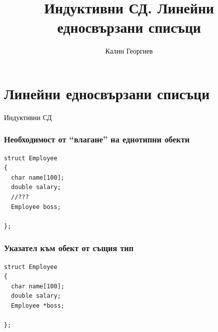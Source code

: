 \documentclass{beamer}
\begin{document}
\title[Обектно ориентирано програмиране]{Индуктивни СД. Линейни едносвързани списъци} 
\author{Калин Георгиев} 
\frame{\titlepage} 

\section{Линейни едносвързани списъци} 


\begin{frame}
\centerline{Индуктивни СД}
\end{frame}


\begin{frame}[fragile]
\frametitle{Необходимост от ``влагане'' на еднотипни обекти}
\begin{flushleft}
\begin{lstlisting}
struct Employee
{
  char name[100];
  double salary;
  //???
  Employee boss;

};
\end{lstlisting}  
\end{flushleft}
\end{frame}


\begin{frame}[fragile]
\frametitle{Указател към обект от същия тип}
\begin{flushleft}
\begin{lstlisting}
struct Employee
{
  char name[100];
  double salary;
  Employee *boss;

};
\end{lstlisting}  
\end{flushleft}
\end{frame}
\end{document}
